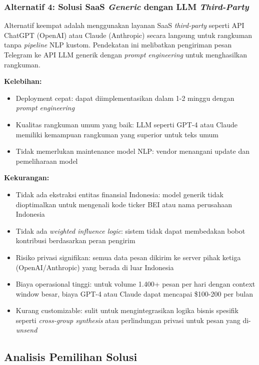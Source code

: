 \subsubsection{Alternatif 4: Solusi SaaS \textit{Generic} dengan LLM \textit{Third-Party}}

Alternatif keempat adalah menggunakan layanan SaaS \textit{third-party} seperti API ChatGPT (OpenAI) atau Claude (Anthropic) secara langsung untuk rangkuman tanpa \textit{pipeline} NLP kustom. Pendekatan ini melibatkan pengiriman pesan Telegram ke API LLM generik dengan \textit{prompt engineering} untuk menghasilkan rangkuman.

\textbf{Kelebihan:}
\begin{itemize}
\item Deployment cepat: dapat diimplementasikan dalam 1-2 minggu dengan \textit{prompt engineering}
\item Kualitas rangkuman umum yang baik: LLM seperti GPT-4 atau Claude memiliki kemampuan rangkuman yang superior untuk teks umum
\item Tidak memerlukan maintenance model NLP: vendor menangani update dan pemeliharaan model
\end{itemize}

\textbf{Kekurangan:}
\begin{itemize}
\item Tidak ada ekstraksi entitas finansial Indonesia: model generik tidak dioptimalkan untuk mengenali kode ticker BEI atau nama perusahaan Indonesia
\item Tidak ada \textit{weighted influence logic}: sistem tidak dapat membedakan bobot kontribusi berdasarkan peran pengirim
\item Risiko privasi signifikan: semua data pesan dikirim ke server pihak ketiga (OpenAI/Anthropic) yang berada di luar Indonesia
\item Biaya operasional tinggi: untuk volume 1.400+ pesan per hari dengan context window besar, biaya GPT-4 atau Claude dapat mencapai \$100-200 per bulan
\item Kurang customizable: sulit untuk mengintegrasikan logika bisnis spesifik seperti \textit{cross-group synthesis} atau perlindungan privasi untuk pesan yang di-\textit{unsend}
\end{itemize}

\subsection{Analisis Pemilihan Solusi}

